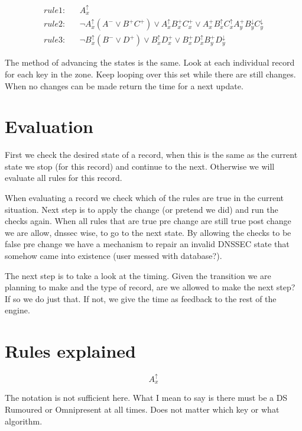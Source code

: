 \documentclass[twoside, a4paper]{article}
\begin{document}
\begin{eqnarray}
\label{eqn:rule1}
rule1:	&& A_{x}^{\uparrow} \\
\label{eqn:rule2}
rule2:	&& \neg A_{x}^{\uparrow} (A^{-} \vee B^{+} C^{+}) \vee A_{x}^{\uparrow}
	B_{x}^{+} C_{x}^{+} \vee A_{x}^{+} B_{x}^{\uparrow} C_{x}^{\uparrow}
	A_{y}^{+} B_{y}^{\downarrow} C_{y}^{\downarrow}\\
\label{eqn:rule3}
rule3:	&& \neg B_{x}^{\uparrow} (B^{-} \vee D^{+}) \vee B_{x}^{\uparrow}
	D_{x}^{+} \vee B_{x}^{+} D_{x}^{\uparrow} B_{y}^{+}
	D_{y}^{\downarrow}
\end{eqnarray}

The method of advancing the states is the same. Look at each individual  record
for each key in the zone. Keep looping over this set while there are 
still changes. When no changes can be made return the time for a next update.

\section{Evaluation}

First we check the desired state of a record, when this is the same as the
current state we stop (for this record) and continue to the next. Otherwise
we will evaluate all rules for this record.

When evaluating a record we check which of the rules are true in the current situation.
Next step is to apply the change (or pretend we did) and run the checks
again. When all rules that are true pre change are still true post change we
are allow, dnssec wise, to go to the next state. By allowing the checks 
to be false pre change we have a mechanism to repair an invalid DNSSEC 
state that somehow came into existence (user messed with database?).

The next step is to take a look at the timing. Given the transition we
are planning to make and the type of record, are we allowed to make the next step?
If so we do just that. If not, we give the time as feedback to the rest of
the engine.

\section{Rules explained}

\begin{equation}
A_{x}^{\uparrow} 
\end{equation}

The notation is not sufficient here. What I mean to say is there must
be a DS Rumoured or Omnipresent at all times. Does not matter which key
or what algorithm.
\end{document}
